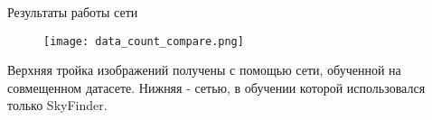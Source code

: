 
\begin{frame}{Результаты работы сети}
\begin{figure}
\centering
\texttt{[image: data\_count\_compare.png]}
\end{figure}
    Верхняя тройка изображений получены с помощью сети, обученной на совмещенном датасете.
    Нижняя - сетью, в обучении которой использовался только SkyFinder.
\end{frame}